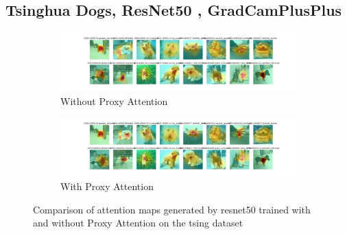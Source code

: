 \subsection{Tsinghua Dogs, ResNet50 , GradCamPlusPlus}
% 
    \begin{figure}[H]
        \begin{subfigure}[b]{1\textwidth}
            \includegraphics[width=\linewidth]{images/gpp_tsing_resnet50_noproxy_0.pdf}
            \caption{Without Proxy Attention}
        \end{subfigure}
        \begin{subfigure}[b]{1\textwidth}
            \includegraphics[width=\linewidth]{images/gpp_tsing_resnet50_proxy_0.pdf}
            \caption{With Proxy Attention}
        \end{subfigure}
        \caption{Comparison of attention maps generated by resnet50 trained with and without Proxy Attention on the tsing dataset}
    \end{figure}


